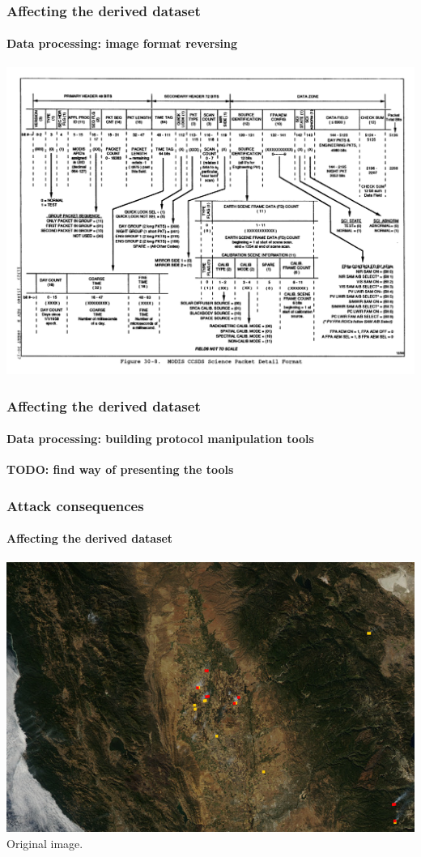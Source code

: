 \documentclass{beamer}
\begin{document}
\begin{frame}
  \frametitle{Affecting the derived dataset}
  \framesubtitle{Data processing: image format reversing}
  \includegraphics[width=\textwidth]{images/image_format.png}
\end{frame}

\begin{frame}
  \frametitle{Affecting the derived dataset}
  \framesubtitle{Data processing: building protocol manipulation tools}

  \textbf{TODO: find way of presenting the tools}
\end{frame}

\begin{frame}
  \frametitle{Attack consequences}
  \framesubtitle{Affecting the derived dataset}
  \includegraphics[width=\textwidth]{images/injection/original.jpg}
  \newline
  \centering
  Original image.
\end{frame}
\end{document}
